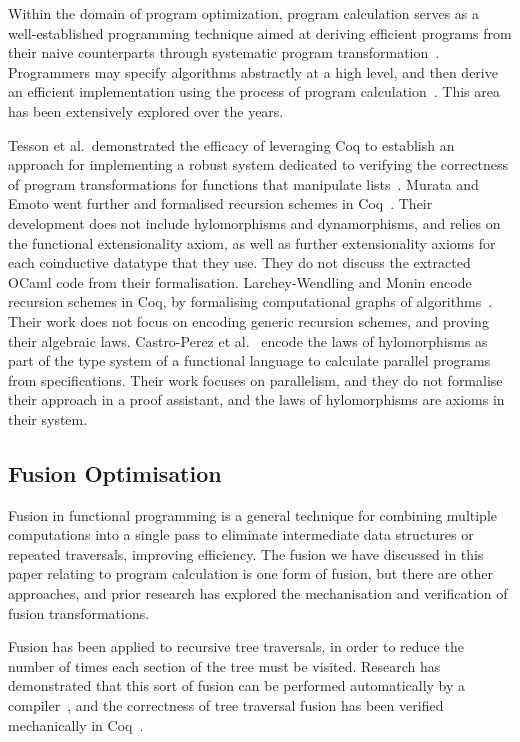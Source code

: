 \documentclass[a4paper,anonymous, UKenglish,cleveref, autoref, thm-restate]{lipics-v2021}
\begin{document}
Within the domain of program optimization, program calculation serves as a
well-established programming technique aimed at deriving efficient programs from
their naive counterparts through systematic program
transformation~\cite{gibbonsSquiggol}. Programmers may specify algorithms
abstractly at a high level, and then derive an efficient implementation using
the process of program calculation~\cite{BirddeMoor96:Algebra}. This area has
been extensively explored over the years.

Tesson et al.\ demonstrated the efficacy of leveraging Coq to establish an
approach for implementing a robust system dedicated to verifying the correctness
of program transformations for functions that manipulate
lists~\cite{10.1007/978-3-642-17796-5_10}. Murata and Emoto went further and
formalised recursion schemes in Coq~\cite{MurataE19}. Their development does not
include hylomorphisms and dynamorphisms, and relies on the functional
extensionality axiom, as well as further extensionality axioms for each
coinductive datatype that they use. They do not discuss the extracted OCaml code
from their formalisation. Larchey-Wendling and Monin encode recursion schemes in
Coq, by formalising computational graphs of algorithms~\cite{larchey2022braga}.
Their work does not focus on encoding generic recursion schemes, and proving
their algebraic laws. Castro-Perez et al.~\cite{farmsCastro} encode the laws of
hylomorphisms as part of the type system of a functional language to calculate
parallel programs from specifications. Their work focuses on parallelism, and
they do not formalise their approach in a proof assistant, and the laws of
hylomorphisms are axioms in their system.

\subsection{Fusion Optimisation}\label{sec:fusion}

Fusion in functional programming is a general technique for combining multiple
computations into a single pass to eliminate intermediate data structures or
repeated traversals, improving efficiency. The fusion we have discussed in this
paper relating to program calculation is one form of fusion, but there are other
approaches, and prior research has explored the mechanisation and verification
of fusion transformations.

Fusion has been applied to recursive tree traversals, in order to reduce the
number of times each section of the tree must be visited. Research has
demonstrated that this sort of fusion can be performed automatically by a
compiler~\cite{10.1145/3133900}, and the correctness of tree traversal fusion
has been verified mechanically in Coq~\cite{10.1145/3377555.3377884}.
\end{document}
